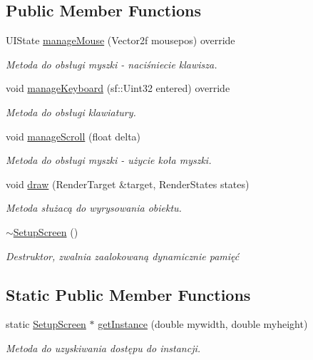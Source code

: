 \subsection*{Public Member Functions}
\begin{DoxyCompactItemize}
\item 
U\+I\+State \mbox{\hyperlink{class_setup_screen_a0057c82efae24568d4867558fa66167d}{manage\+Mouse}} (Vector2f mousepos) override
\begin{DoxyCompactList}\small\item\em Metoda do obsługi myszki -\/ naciśniecie klawisza. \end{DoxyCompactList}\item 
void \mbox{\hyperlink{class_setup_screen_ac1b4b500907cf569e58a6a98f082e8d2}{manage\+Keyboard}} (sf\+::\+Uint32 entered) override
\begin{DoxyCompactList}\small\item\em Metoda do obsługi klawiatury. \end{DoxyCompactList}\item 
void \mbox{\hyperlink{class_setup_screen_af1374ba49c48b6b4a832b54422851e5d}{manage\+Scroll}} (float delta)
\begin{DoxyCompactList}\small\item\em Metoda do obsługi myszki -\/ użycie koła myszki. \end{DoxyCompactList}\item 
void \mbox{\hyperlink{class_setup_screen_a64ca86c7735fa3fc900cc0d5466c2d53}{draw}} (Render\+Target \&target, Render\+States states)
\begin{DoxyCompactList}\small\item\em Metoda służacą do wyrysowania obiektu. \end{DoxyCompactList}\item 
\mbox{\label{class_setup_screen_ad823782ae1c813944f02da4f01e071ff}} 
\mbox{\hyperlink{class_setup_screen_ad823782ae1c813944f02da4f01e071ff}{$\sim$\+Setup\+Screen}} ()
\begin{DoxyCompactList}\small\item\em Destruktor, zwalnia zaalokowaną dynamicznie pamięć \end{DoxyCompactList}\end{DoxyCompactItemize}
\subsection*{Static Public Member Functions}
\begin{DoxyCompactItemize}
\item 
static \mbox{\hyperlink{class_setup_screen}{Setup\+Screen}} $\ast$ \mbox{\hyperlink{class_setup_screen_aa107ca15f6dee4a39b59c993e919cc56}{get\+Instance}} (double mywidth, double myheight)
\begin{DoxyCompactList}\small\item\em Metoda do uzyskiwania dostępu do instancji. \end{DoxyCompactList}\end{DoxyCompactItemize}
